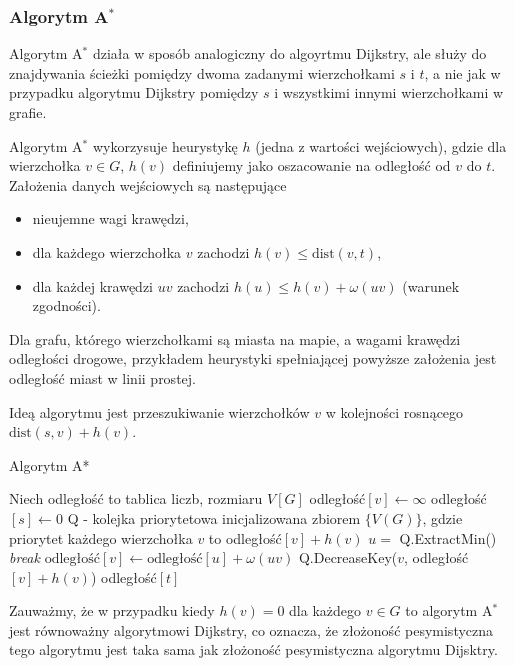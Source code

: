 \subsubsection{Algorytm A\texorpdfstring{$^*$}{TEXT}}
Algorytm A$^*$ działa w sposób analogiczny do algoyrtmu Dijkstry, 
ale służy do znajdywania ścieżki pomiędzy dwoma zadanymi wierzchołkami
$s$ i $t$, a nie jak w przypadku algorytmu Dijkstry pomiędzy $s$
i wszystkimi innymi wierzchołkami w grafie.

Algorytm A$^*$ wykorzysuje heurystykę $h$ (jedna z wartości 
wejściowych), gdzie dla wierzchołka
$v \in G$, $h(v)$ definiujemy jako oszacowanie
na odległość od $v$ do $t$. Założenia danych wejściowych są następujące
\begin{itemize}
	\item nieujemne wagi krawędzi,
	\item dla każdego wierzchołka $v$ zachodzi $h(v) \leq \text{dist}(v, t)$,
	\item dla każdej krawędzi $uv$ zachodzi $h(u) \leq h(v) + \omega(uv)$ (warunek zgodności).
\end{itemize}
Dla grafu, którego wierzchołkami są miasta na mapie, a wagami krawędzi odległości drogowe, przykładem heurystyki spełniającej powyższe założenia jest odległość miast w linii prostej.

 Ideą algorytmu jest przeszukiwanie wierzchołków $v$ w kolejności 
rosnącego $\text{dist}(s,v) + h(v)$. 

\begin{algorithm}[H]
	\caption{Algorytm A*}
	\begin{algorithmic}[1]
		\State Niech odległość to tablica liczb, rozmiaru $V[G]$
		\State odległość$[v]\gets\infty$
		\EndFor
		\State odległość$[s]\gets 0$
		\State Q - kolejka priorytetowa inicjalizowana 
		zbiorem $\{V(G)\}$, gdzie priorytet każdego wierzchołka $v$
		to odległość$[v] + h(v)$
		\State $u =$ Q.ExtractMin()
		\State \textit{break}
		\EndIf
		\State $\text{odległość}[v] \gets \text{odległość}[u] + \omega(uv)$
		\State Q.DecreaseKey($v$, odległość$[v] + h(v)$)
		\EndIf
		\EndFor
		\EndWhile
		\State \Return odległość$[t]$
		\EndProcedure
	\end{algorithmic}
	\label{aStar_alg}
\end{algorithm}

Zauważmy, że w przypadku kiedy $h(v) = 0$ dla każdego $v \in G$ 
to algorytm A$^*$ jest równoważny algorytmowi Dijkstry, co oznacza, że
złożoność pesymistyczna tego algorytmu jest taka sama jak złożoność
pesymistyczna algorytmu Dijsktry.

